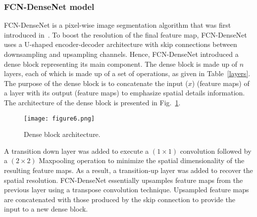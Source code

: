 \subsubsection{FCN-DenseNet model}
FCN-DenseNet is a pixel-wise image segmentation algorithm that was first introduced in~\cite{Jegou}.
To boost the resolution of the final feature map, FCN-DenseNet uses a U-shaped encoder-decoder architecture with skip connections between downsampling and upsampling channels.
Hence, FCN-DenseNet introduced a dense block representing its main component.
The dense block is made up of \(n\) layers, each of which is made up of a set of operations, as given in Table~\ref{layers}.
The purpose of the dense block is to concatenate the input (\(x\)) (feature maps) of a layer  with its output (feature maps) to emphasize spatial details information.
The architecture of the dense block is presented in Fig.~\ref{dense_block}. 
\begin{figure} [h!]
	\begin{center}
		\texttt{[image: figure6.png]}
	\end{center}
	\caption{Dense block architecture.} 
	\label{dense_block}
\end{figure}

A transition down layer was added to execute a \((1\times 1)\) convolution followed by a \((2\times 2)\) Maxpooling operation to minimize the spatial dimensionality of the resulting feature maps.
As a result, a transition-up layer was added to recover the spatial resolution.
FCN-DenseNet essentially upsamples feature maps from the previous layer using a transpose convolution technique.
Upsampled feature maps are concatenated with those produced by the skip connection to provide the input to a new dense block.

